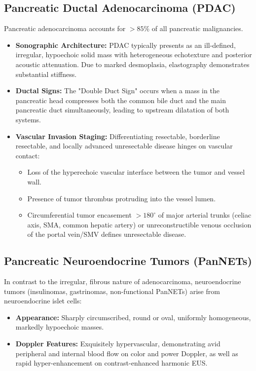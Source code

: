 \documentclass[11pt,a4paper]{article}
\begin{document}
\subsection{Pancreatic Ductal Adenocarcinoma (PDAC)}
Pancreatic adenocarcinoma accounts for $> 85\%$ of all pancreatic malignancies.
\begin{itemize}[leftmargin=2em]
    \item \textbf{Sonographic Architecture:} PDAC typically presents as an ill-defined, irregular, hypoechoic solid mass with heterogeneous echotexture and posterior acoustic attenuation. Due to marked desmoplasia, elastography demonstrates substantial stiffness.
    \item \textbf{Ductal Signs:} The "Double Duct Sign" occurs when a mass in the pancreatic head compresses both the common bile duct and the main pancreatic duct simultaneously, leading to upstream dilatation of both systems.
    \item \textbf{Vascular Invasion Staging:} Differentiating resectable, borderline resectable, and locally advanced unresectable disease hinges on vascular contact:
    \begin{itemize}
        \item Loss of the hyperechoic vascular interface between the tumor and vessel wall.
        \item Presence of tumor thrombus protruding into the vessel lumen.
        \item Circumferential tumor encasement $> 180^\circ$ of major arterial trunks (celiac axis, SMA, common hepatic artery) or unreconstructible venous occlusion of the portal vein/SMV defines unresectable disease.
    \end{itemize}
\end{itemize}

\subsection{Pancreatic Neuroendocrine Tumors (PanNETs)}
In contrast to the irregular, fibrous nature of adenocarcinoma, neuroendocrine tumors (insulinomas, gastrinomas, non-functional PanNETs) arise from neuroendocrine islet cells:
\begin{itemize}[leftmargin=2em]
    \item \textbf{Appearance:} Sharply circumscribed, round or oval, uniformly homogeneous, markedly hypoechoic masses.
    \item \textbf{Doppler Features:} Exquisitely hypervascular, demonstrating avid peripheral and internal blood flow on color and power Doppler, as well as rapid hyper-enhancement on contrast-enhanced harmonic EUS.
\end{itemize}
\end{document}

